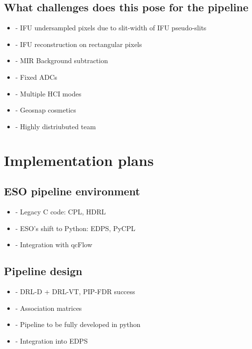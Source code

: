 \documentclass[a4paper]{spie}  %
\begin{document}
\subsection{What challenges does this pose for the pipeline}
\label{ssec:env_challenges}

\begin{itemize}
    \item - IFU undersampled pixels due to slit-width of IFU pseudo-slits
    \item - IFU reconstruction on rectangular pixels
    \item - MIR Background subtraction
    \item - Fixed ADCs
    \item - Multiple HCI modes
    \item - Geosnap cosmetics
    \item - Highly distriubuted team

\end{itemize}

\section{Implementation plans}
\label{sec:implementation}

\subsection{ESO pipeline environment}
\label{ssec:imp_eso}

 \begin{itemize}
     \item - Legacy C code: CPL, HDRL
     \item - ESO's shift to Python: EDPS, PyCPL
     \item - Integration with qcFlow
 \end{itemize}

\subsection{Pipeline design}
\label{ssec:imp_pip}

 \begin{itemize}
     \item - DRL-D + DRL-VT, PIP-FDR success
     \item - Association matrices
     \item - Pipeline to be fully developed in python
     \item - Integration into EDPS
 \end{itemize}
 
\end{document}
